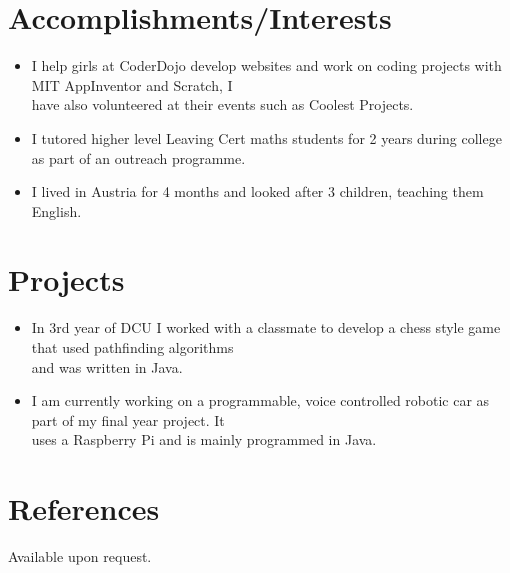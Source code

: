\documentclass[10pt, letterpaper]{article}
\begin{document}
\section{Accomplishments/Interests}
\begin{itemize}
  \item I help girls at CoderDojo develop websites and work on coding projects with MIT AppInventor and Scratch, I \\ 
  have also volunteered at their events such as Coolest Projects.
  \item I tutored higher level Leaving Cert maths students for 2 years during college as part of an outreach programme.
  \item I lived in Austria for 4 months and looked after 3 children, teaching them English.\end{itemize}

\section{Projects}
\begin{itemize}
  \item In 3rd year of DCU I worked with a classmate to develop a chess style game that used pathfinding algorithms \\
  and was written in Java.
  \item I am currently working on a programmable, voice controlled robotic car as part of my final year project. It \\
  uses a Raspberry Pi and is mainly programmed in Java.\end{itemize}
\section{References}
Available upon request.
\end{document}
